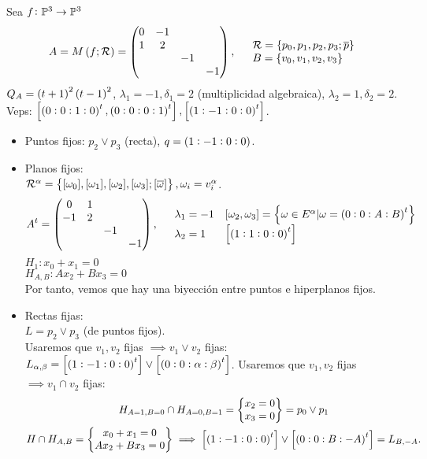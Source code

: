 \begin{example}
	Sea $f \colon \mathbb{P}^3 \to \mathbb{P}^3$ \\
	\[
		A = M\left( f; \mathcal{R}\right) = \begin{pmatrix}
		0 & -1 & & \\
		1 & 2 & & \\
		& & -1 & \\
		& & & -1
		\end{pmatrix}, \quad \begin{array}{l}
		\mathcal{R} = \{p_0, p_1, p_2, p_3; \overline{p}\} \\
		B = \{v_0, v_1, v_2, v_3\}
		\end{array}
	\]
	$Q_A = \left( t+1\right)^2\left( t-1\right)^2$, $\lambda_1 = -1, \delta_1 = 2 $ (multiplicidad algebraica), $\lambda_2 = 1, \delta_2 = 2$. Veps: $\left[ \left(0:0:1:0\right)^t, \left(0:0:0:1\right)^t \right], \left[ \left(1:-1:0:0\right)^t \right]$.
	\begin{itemize}
		\item Puntos fijos: $p_2 \vee p_3$ (recta), $q =\left( 1:-1:0:0\right)$.
		\item Planos fijos: \\
		$\mathcal{R}^\alpha = \left\{ [\omega_0], [\omega_1], [\omega_2], [\omega_3]; [\overline{\omega}]\right\}, \omega_i = v_i^\alpha$.
		\[
			A^t = \begin{pmatrix}
				0 & 1 & & \\
				-1 & 2 & & \\
				& & -1 & \\
				& & & -1
			\end{pmatrix}, \quad
			\begin{array}{ll}
				\lambda_1 = -1 & \left[ \omega_2, \omega_3 \right] = \left\{ \omega \in E^\alpha | \omega = \left( 0:0:A:B\right)^t \right\} \\
				\lambda_2 = 1 & \left[\left(1:1:0:0\right)^t\right]
			\end{array}
		\]
		$H_1 \colon x_0 + x_1 = 0$ \\
		$H_{A,B} \colon Ax_2 + Bx_3 = 0$\\
		Por tanto, vemos que hay una biyección entre puntos e hiperplanos fijos.
		\item Rectas fijas: \\
		$L = p_2 \vee p_3$ (de puntos fijos).\\
		Usaremos que $v_1,v_2$ fijas $\implies v_1 \vee v_2$ fijas: $L_{\alpha,\beta} = \left[\left(1:-1:0:0\right)^t\right]\vee\left[\left(0:0:\alpha:\beta\right)^t\right]$.
		Usaremos que $v_1, v_2$ fijas $\implies v_1 \cap v_2$ fijas:
		\begin{gather*}
			H_{A=1,B=0} \cap H_{A=0,B=1} = \begin{Bmatrix}
				x_2 = 0 \\
				x_3 = 0
			\end{Bmatrix} = p_0 \vee p_1 \\
			H \cap H_{A,B} = \begin{Bmatrix}
				x_0 + x_1 = 0 \\
				Ax_2 + Bx_3 = 0
			\end{Bmatrix} \implies \left[\left(1:-1:0:0\right)^t\right] \vee \left[\left(0:0:B:-A\right)^t\right] = L_{B,-A}.
		\end{gather*}
	\end{itemize}
\end{example}
